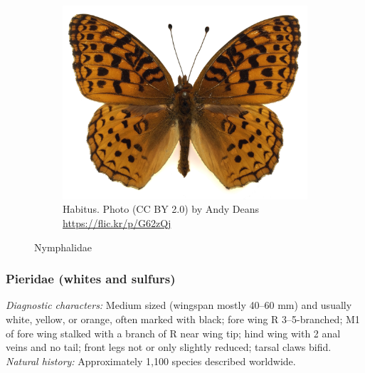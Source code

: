 \documentclass[letterpaper, 11pt]{article}
\begin{document}
\begin{figure}[ht!]
\begin{subfigure}[ht!]{0.5\textwidth}
        \includegraphics[width=\textwidth]{NymphalidHabitus}
        \caption{Habitus. Photo (CC BY 2.0) by Andy Deans \url{https://flic.kr/p/G62zQj}}
        \label{fig:nymphalid2}
    \end{subfigure}
    \caption{Nymphalidae}\label{fig:nymphalids}
\end{figure}

\subsubsection{Pieridae (whites and sulfurs)}
\noindent{}\textit{Diagnostic characters:} Medium sized (wingspan mostly 40--60 mm) and usually white, yellow, or orange, often marked with black; fore wing R 3--5-branched; M1 of fore wing stalked with a branch of R near wing tip; hind wing with 2 anal veins and no tail; front legs not or only slightly reduced; tarsal claws bifid.\\

\noindent{}\textit{Natural history:} Approximately 1,100 species described worldwide.
\end{document}
